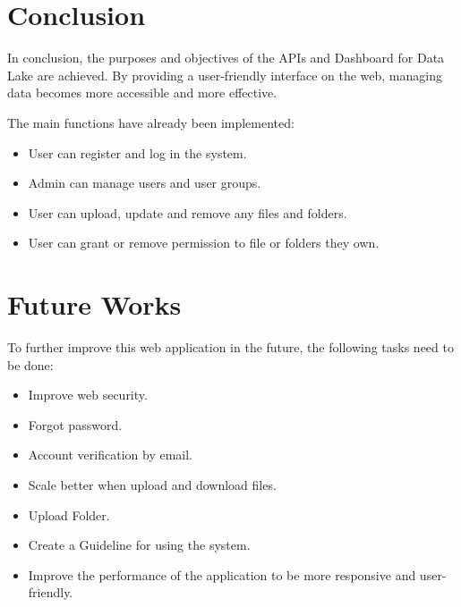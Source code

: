 \section{Conclusion}
In conclusion, the purposes and objectives of the APIs and Dashboard for Data Lake are achieved. By providing a user-friendly interface on the web, managing data becomes more accessible and more effective.

The main functions have already been implemented:
\begin{itemize}
    \item User can register and log in the system. 
    \item Admin can manage users and user groups. 
    \item User can upload, update and remove any files and folders.
    \item User can grant or remove permission to file or folders they own. 
\end{itemize}
\section{Future Works}
To further improve this web application in the future, the following tasks need to be done: 
\begin{itemize}
    \item Improve web security.
    \item Forgot password. 
    \item Account verification by email.
    \item Scale better when upload and download files.
    \item Upload Folder. 
    \item Create a Guideline for using the system. 
    \item Improve the performance of the application to be more responsive and user-friendly.
\end{itemize}